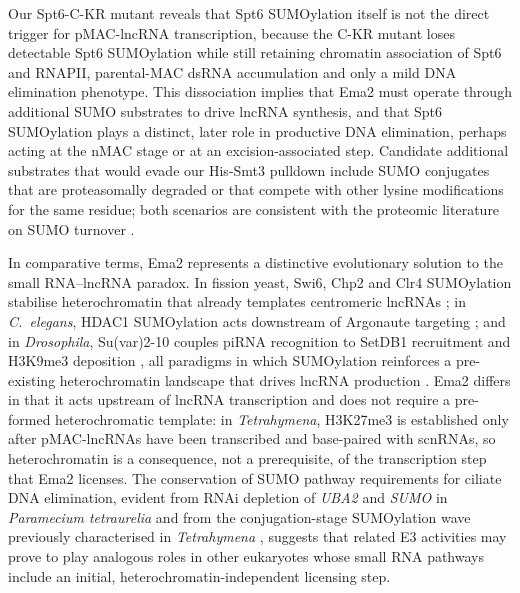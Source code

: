 \documentclass[11pt]{article}
\begin{document}
Our Spt6-C-KR mutant reveals that Spt6 SUMOylation itself is not the
direct trigger for pMAC-lncRNA transcription, because the C-KR mutant
loses detectable Spt6 SUMOylation while still retaining chromatin
association of Spt6 and RNAPII, parental-MAC dsRNA accumulation and
only a mild DNA elimination phenotype. This dissociation implies that
Ema2 must operate through additional SUMO substrates to drive lncRNA
synthesis, and that Spt6 SUMOylation plays a distinct, later role in
productive DNA elimination, perhaps acting at the nMAC stage or at an
excision-associated step. Candidate additional substrates that would
evade our His-Smt3 pulldown include SUMO conjugates that are
proteasomally degraded or that compete with other lysine modifications
for the same residue; both scenarios are consistent with the proteomic
literature on SUMO turnover \citep{praefcke2012sumo}.

In comparative terms, Ema2 represents a distinctive evolutionary
solution to the small RNA--lncRNA paradox. In fission yeast, Swi6, Chp2
and Clr4 SUMOylation stabilise heterochromatin that already templates
centromeric lncRNAs \citep{shin2005sumo}; in \emph{C.~elegans}, HDAC1
SUMOylation acts downstream of Argonaute targeting
\citep{kim2021hdac1}; and in \emph{Drosophila}, Su(var)2-10 couples
piRNA recognition to SetDB1 recruitment and H3K9me3 deposition
\citep{ninova2019suvar}, all paradigms in which SUMOylation reinforces
a pre-existing heterochromatin landscape that drives lncRNA production
\citep{lethomas2014rhino,andersen2017heterochromatin,law2013shh1,volpe2002rnai,hall2002heterochromatin}.
Ema2 differs in that it acts upstream of lncRNA transcription and does
not require a pre-formed heterochromatic template: in \emph{Tetrahymena},
H3K27me3 is established only after pMAC-lncRNAs have been transcribed and
base-paired with scnRNAs, so heterochromatin is a consequence, not a
prerequisite, of the transcription step that Ema2 licenses. The
conservation of SUMO pathway requirements for ciliate DNA elimination,
evident from RNAi depletion of \emph{UBA2} and \emph{SUMO} in
\emph{Paramecium tetraurelia} \citep{matsuda2006sumo} and from the
conjugation-stage SUMOylation wave previously characterised in
\emph{Tetrahymena} \citep{nasir2015sumo}, suggests that related E3
activities may prove to play analogous roles in other eukaryotes whose
small RNA pathways include an initial, heterochromatin-independent
licensing step.
\end{document}
